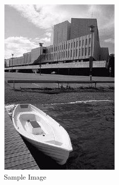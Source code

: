 \begin{figure}
	\centering
	\begin{subfigure}{0.35\textwidth}
		\centering
		\includegraphics[width=\linewidth]{figures/tensor_voting_input}
		\caption{ Sample Image }
		\label{fig:tensor_voting_input}
	\end{subfigure}
	\begin{subfigure}{0.35\textwidth}
		\centering

\end{subfigure}
\end{figure}
